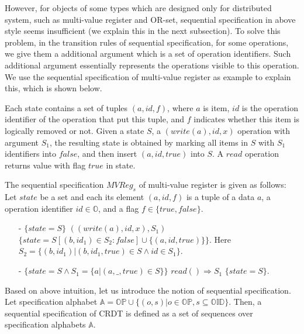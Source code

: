 However, for objects of some types which are designed only for distributed system, such as multi-value register and OR-set, sequential specification in above style seems insufficient (we explain this in the next subsection). To solve this problem, in the transition rules of sequential specification, for some operations, we give them a additional argument which is a set of operation identifiers. Such additional argument essentially represents the operations visible to this operation. We use the sequential specification of multi-value register as example to explain this, which is shown below.

Each state contains a set of tuples $(a,\mathit{id},f)$, where $a$ is item, $\mathit{id}$ is the operation identifier of the operation that put this tuple, and $f$ indicates whether this item is logically removed or not. Given a state $S$, a $(write(a),\mathit{id},x)$ operation with argument $S_1$, the resulting state is obtained by marking all items in $S$ with $S_1$ identifiers into $\mathit{false}$, and then insert $(a,id,\mathit{true})$ into $S$. A $\mathit{read}$ operation returns value with flag $\mathit{true}$ in state.


\begin{example}
\label{definition:sequential specification of multi-value register}
The sequential specification $\mathit{MVReg}_s$ of multi-value register is given as follows: Let $\mathit{state}$ be a set and each its element $(a,\mathit{id},f)$ is a tuple of a data $a$, a operation identifier $\mathit{id} \in \mathbb{O}$, and a flag $f \in \{ \mathit{true},\mathit{false} \}$.
\begin{itemize}
\setlength{\itemsep}{0.5pt}
\item[-] $\{ \mathit{state} = S \}$ $((write(a),\mathit{id},x),S_1)$ $\{ \mathit{state} = S[(b,\mathit{id}_1) \in S_2 : \mathit{false}]
\cup
\{ (a,id,\mathit{true}) \}
\}$. Here $S_2 = \{ (b,\mathit{id}_1) \vert (b,\mathit{id}_1,\mathit{true}) \in S \wedge id \in S_1 \}$.
\item[-] $\{ \mathit{state} = S \wedge S_1 = \{ a \vert (a,\_,\mathit{true}) \in S \} \}$ $read() \Rightarrow S_1$ $\{ \mathit{state} = S \}$.
\end{itemize}
\end{example}

Based on above intuition, let us introduce the notion of sequential specification. Let specification alphabet $\mathbb{A} = \mathbb{OP} \cup \{ (o,s) \vert o \in \mathbb{OP}, s \subseteq \mathbb{OID} \}$. Then, a sequential specification of CRDT is defined as a set of sequences over specification alphabets $\mathbb{A}$.

